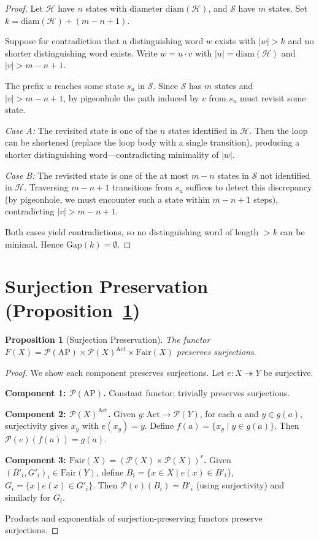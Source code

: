 \documentclass[11pt]{article}
\newtheorem{proposition}[theorem]{Proposition}
\newcommand{\Pow}{\mathcal{P}}
\newcommand{\Fair}{\ensuremath{\mathrm{Fair}}}
\newcommand{\Act}{\ensuremath{\mathrm{Act}}}
\newcommand{\AP}{\ensuremath{\mathrm{AP}}}
\newcommand{\diam}{\ensuremath{\mathrm{diam}}}
\begin{document}
\begin{proof}
Let $\mathcal{H}$ have $n$ states with diameter $\diam(\mathcal{H})$, and
$\mathcal{S}$ have $m$ states.
Set $k = \diam(\mathcal{H}) + (m - n + 1)$.

Suppose for contradiction that a distinguishing word $w$ exists with
$|w| > k$ and no shorter distinguishing word exists.
Write $w = u \cdot v$ with $|u| = \diam(\mathcal{H})$ and
$|v| > m - n + 1$.

The prefix $u$ reaches some state $s_u$ in $\mathcal{S}$.
Since $\mathcal{S}$ has $m$ states and $|v| > m - n + 1$, by pigeonhole
the path induced by $v$ from $s_u$ must revisit some state.

\emph{Case A:} The revisited state is one of the $n$ states identified
in $\mathcal{H}$.
Then the loop can be shortened (replace the loop body with a single
transition), producing a shorter distinguishing word---contradicting
minimality of $|w|$.

\emph{Case B:} The revisited state is one of the at most $m - n$
states in $\mathcal{S}$ not identified in $\mathcal{H}$.
Traversing $m - n + 1$ transitions from $s_u$ suffices to detect this
discrepancy (by pigeonhole, we must encounter such a state within
$m - n + 1$ steps), contradicting $|v| > m - n + 1$.

Both cases yield contradictions, so no distinguishing word of length
$> k$ can be minimal.
Hence $\mathrm{Gap}(k) = \emptyset$.
\end{proof}


\section{Surjection Preservation (Proposition~\ref{prop:surj})}
\label{app:surjection}

\begin{proposition}[Surjection Preservation]
\label{prop:surj}
The functor $F(X) = \Pow(\AP) \times \Pow(X)^{\Act} \times \Fair(X)$
preserves surjections.
\end{proposition}

\begin{proof}
We show each component preserves surjections.
Let $e : X \twoheadrightarrow Y$ be surjective.

\textbf{Component 1: $\Pow(\AP)$.}
Constant functor; trivially preserves surjections.

\textbf{Component 2: $\Pow(X)^{\Act}$.}
Given $g : \Act \to \Pow(Y)$, for each $a$ and $y \in g(a)$, surjectivity
gives $x_y$ with $e(x_y) = y$.
Define $f(a) = \{x_y \mid y \in g(a)\}$.
Then $\Pow(e)(f(a)) = g(a)$.

\textbf{Component 3: $\Fair(X) = (\Pow(X) \times \Pow(X))^r$.}
Given $(B'_i, G'_i)_i \in \Fair(Y)$, define
$B_i = \{x \in X \mid e(x) \in B'_i\}$, $G_i = \{x \mid e(x) \in G'_i\}$.
Then $\Pow(e)(B_i) = B'_i$ (using surjectivity) and similarly for $G_i$.

Products and exponentials of surjection-preserving functors preserve
surjections.
\end{proof}
\end{document}
